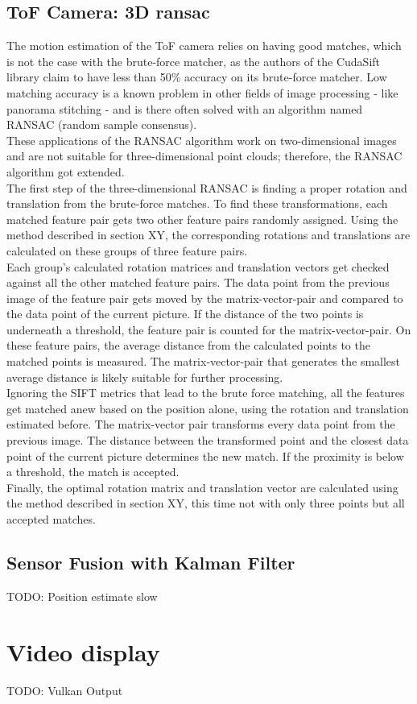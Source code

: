 \subsection{ToF Camera: 3D ransac}
\label{sec:ToFPosition_RANSAC}
The motion estimation of the ToF camera relies on having good matches, which is not the case with the brute-force matcher, as the authors of the CudaSift library claim to have less than 50\% accuracy on its brute-force matcher.\cite{cudaSiftRepo} Low matching accuracy is a known problem in other fields of image processing - like panorama stitching - and is there often solved with an algorithm named RANSAC (random sample consensus).\\
These applications of the RANSAC algorithm work on two-dimensional images and are not suitable for three-dimensional point clouds; therefore, the RANSAC algorithm got extended.\\
The first step of the three-dimensional RANSAC is finding a proper rotation and translation from the brute-force matches. To find these transformations, each matched feature pair gets two other feature pairs randomly assigned. Using the method described in section XY, the corresponding rotations and translations are calculated on these groups of three feature pairs.\\
Each group's calculated rotation matrices and translation vectors get checked against all the other matched feature pairs. The data point from the previous image of the feature pair gets moved by the matrix-vector-pair and compared to the data point of the current picture. If the distance of the two points is underneath a threshold, the feature pair is counted for the matrix-vector-pair. On these feature pairs, the average distance from the calculated points to the matched points is measured. The matrix-vector-pair that generates the smallest average distance is likely suitable for further processing.\\
Ignoring the SIFT metrics that lead to the brute force matching, all the features get matched anew based on the position alone, using the rotation and translation estimated before. The matrix-vector pair transforms every data point from the previous image. The distance between the transformed point and the closest data point of the current picture determines the new match. If the proximity is below a threshold, the match is accepted.\\
Finally, the optimal rotation matrix and translation vector are calculated using the method described in section XY, this time not with only three points but all accepted matches.






\subsection{Sensor Fusion with Kalman Filter}
\label{sec:SensorFusion}
TODO: Position estimate slow
\section{Video display}
\label{sec:VideoDisplay}
TODO: Vulkan Output